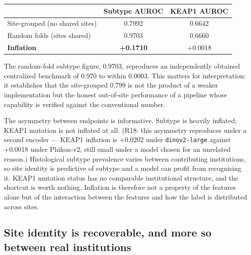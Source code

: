 \documentclass[11pt,a4paper]{article}
\begin{document}
\begin{center}
\begin{tabular}{@{}lcc@{}}
\toprule
& \textbf{Subtype AUROC} & \textbf{KEAP1 AUROC} \\
\midrule
Site-grouped (no shared sites) & 0.7992 & 0.6642 \\
Random folds (sites shared) & 0.9703 & 0.6660 \\
\midrule
\textbf{Inflation} & \textbf{+0.1710} & +0.0018 \\
\bottomrule
\end{tabular}
\end{center}

The random-fold subtype figure, 0.9703, reproduces an independently obtained centralized
benchmark of 0.970 to within 0.0003. This matters for interpretation: it establishes that the
site-grouped 0.799 is not the product of a weaker implementation but the honest out-of-site
performance of a pipeline whose capability is verified against the conventional number.

The asymmetry between endpoints is informative. Subtype is heavily inflated; KEAP1 mutation is
not inflated at all. \textcolor{qred}{(R18: this asymmetry reproduces under a second encoder ---
KEAP1 inflation is +0.0202 under \texttt{dinov2-large} against +0.0018 under Phikon-v2, still small
under a model chosen for an unrelated reason.)} Histological subtype prevalence varies between contributing institutions,
so site identity is predictive of subtype and a model can profit from recognising it. KEAP1
mutation status has no comparable institutional structure, and the shortcut is worth nothing.
Inflation is therefore not a property of the features alone but of the interaction between the
features and how the label is distributed across sites.

\subsection{Site identity is recoverable, and more so between real institutions}
\end{document}

